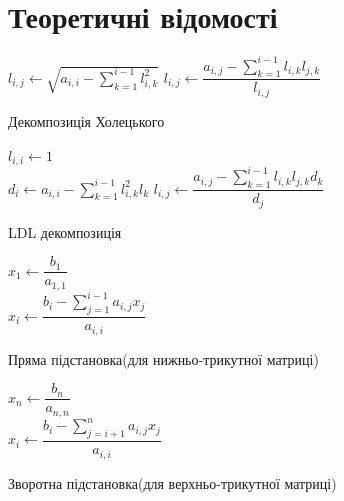 \section*{\centering Теоретичні відомості}

\begin{algorithm}[h]
    \SetAlgoLined
    {
        {
            {
                $l_{i, j} \leftarrow \sqrt{a_{i,i} - \sum \limits_{k=1}^{i-1} l_{i, k}^2} $
            }
            \Else
            {
                $l_{i, j} \leftarrow \dfrac{a_{i, j} - \sum \limits_{k=1}^{i-1} l_{i, k} l_{j, k}}{l_{i, j}} $
            }
        }
    }
    \caption{Декомпозиція Холецького}
    \label{alg:cholesky}
\end{algorithm}

\begin{algorithm}[h]
    \SetAlgoLined
    {
        {
            {
                $l_{i, i} \leftarrow 1$ \\
                $d_{i} \leftarrow a_{i,i} - \sum \limits_{k=1}^{i-1} l_{i, k}^2 l_k $
            }
            \Else
            {
                $l_{i, j} \leftarrow \dfrac{a_{i, j} - \sum \limits_{k=1}^{i-1} l_{i, k} l_{j, k} d_k}{d_{j}} $
            }
        }
    }
    \caption{LDL декомпозиція}
    \label{alg:ldl}
\end{algorithm}

\begin{algorithm}[h]
    \SetAlgoLined
    $x_1 \leftarrow \dfrac{b_1}{a_{1,1}} $ \\
    {
        $x_i \leftarrow \dfrac{b_i - \sum \limits_{j=1}^{i-1} a_{i, j}x_j}{a_{i,i}}$
    }
    \caption{Пряма підстановка(для нижньо-трикутної матриці)}
    \label{alg:forward}
\end{algorithm}

\begin{algorithm}[h]
    \SetAlgoLined
    $x_n \leftarrow \dfrac{b_n}{a_{n,n}} $ \\
    {
        $x_i \leftarrow \dfrac{b_i - \sum \limits_{j=i+1}^{n} a_{i, j}x_{j}}{a_{i,i}}$
    }
    \caption{Зворотна підстановка(для верхньо-трикутної матриці)}
    \label{alg:backward}
\end{algorithm}
